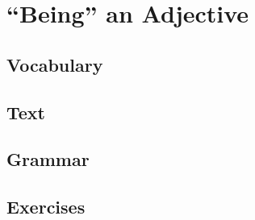 \chapter{``Being'' an Adjective}
\section*{Vocabulary}
\section*{Text}
\section*{Grammar}
\section*{Exercises}
